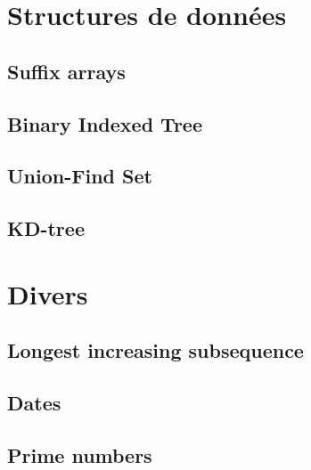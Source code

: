 \documentclass[12pt]{article}
\begin{document}
\section{Structures de données}

\subsection{Suffix arrays}
{\scriptsize}

\subsection{Binary Indexed Tree}
{\scriptsize}

\subsection{Union-Find Set}
{\scriptsize}

\subsection{KD-tree}
{\scriptsize}

\section{Divers}

\subsection{Longest increasing subsequence}
{\scriptsize}

\subsection{Dates}
{\scriptsize}

\subsection{Prime numbers}
{\scriptsize}
\end{document}
